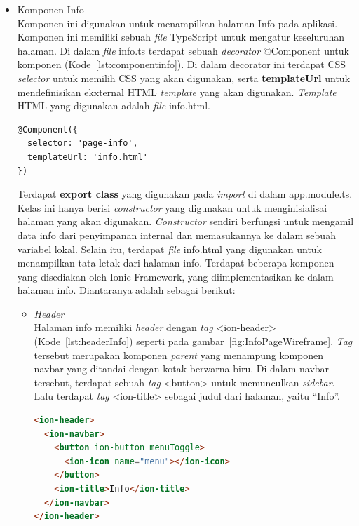 \begin{itemize}
	\item Komponen Info \\
	Komponen ini digunakan untuk menampilkan halaman Info pada aplikasi. Komponen ini memiliki sebuah \textit{file} TypeScript untuk mengatur keseluruhan halaman. Di dalam \textit{file} info.ts terdapat sebuah \textit{decorator} @Component untuk komponen (Kode~\ref{lst:componentinfo}). Di dalam decorator ini terdapat CSS \textit{selector} untuk memilih CSS yang akan digunakan, serta \textbf{templateUrl} untuk mendefinisikan ekxternal HTML \textit{template} yang akan digunakan. \textit{Template} HTML yang digunakan adalah \textit{file} info.html. 
	
\begin{lstlisting}[language=html, label={lst:componentinfo}, caption=@Component pada info.ts]
@Component({
  selector: 'page-info',
  templateUrl: 'info.html'
})
\end{lstlisting} 

	Terdapat \textbf{export class} yang digunakan pada \textit{import} di dalam app.module.ts. Kelas ini hanya berisi \textit{constructor} yang digunakan untuk menginisialisai halaman yang akan digunakan. \textit{Constructor} sendiri berfungsi untuk mengamil data info dari penyimpanan internal dan memasukannya ke dalam sebuah variabel lokal.
	Selain itu, terdapat \textit{file} info.html yang digunakan untuk menampilkan tata letak dari halaman info. Terdapat beberapa komponen yang disediakan oleh Ionic Framework, yang diimplementasikan ke dalam halaman info. Diantaranya adalah sebagai berikut:
	
	\begin{itemize}
		\item \textit{Header} \\
		Halaman info memiliki \textit{header} dengan \textit{tag} <ion-header> (Kode~\ref{lst:headerInfo}) seperti pada gambar~\ref{fig:InfoPageWireframe}. \textit{Tag} tersebut merupakan komponen \textit{parent} yang menampung komponen navbar yang ditandai dengan kotak berwarna biru. Di dalam navbar tersebut, terdapat sebuah \textit{tag} <button> untuk memunculkan \textit{sidebar}. Lalu terdapat \textit{tag} <ion-title> sebagai judul dari halaman, yaitu ``Info''.

\begin{lstlisting}[language=html, label={lst:headerInfo}, caption=\textit{Header} pada info.html]
<ion-header>
  <ion-navbar>
    <button ion-button menuToggle>
      <ion-icon name="menu"></ion-icon>
    </button>
    <ion-title>Info</ion-title>
  </ion-navbar>
</ion-header>
\end{lstlisting} 


\end{itemize}
\end{itemize}
